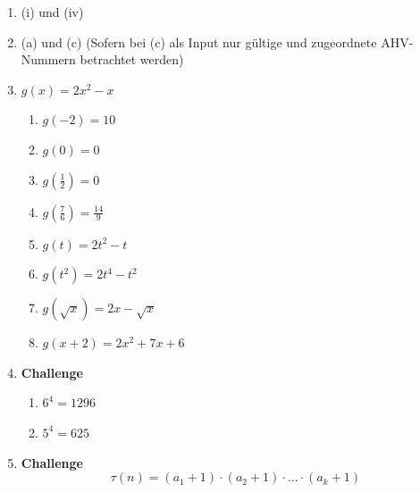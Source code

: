 \begin{enumerate}
    \item (i) und (iv)
    \item (a) und (c) (Sofern bei (c) als Input nur gültige und zugeordnete AHV-Nummern betrachtet werden)
    \item \(g(x) = 2x^2-x\)
          \begin{enumerate}
              \item \(g(-2)=10\)
              \item \(g(0)=0\)
              \item \(g\left(\frac12\right)=0\)
              \item \(g\left(\frac76\right)=\frac{14}{9}\)
              \item \(g(t)=2t^2-t\)
              \item \(g(t^2)=2t^4-t^2\)
              \item \(g(\sqrt{x})=2x-\sqrt{x}\)
              \item \(g(x+2)=2x^2+7x+6\)
          \end{enumerate}


    \item \textbf{Challenge}
          \begin{enumerate}
              \item \(6^4=1296\)
              \item \(5^4=625\)
          \end{enumerate}

    \item \textbf{Challenge}
          \[
              \tau(n)=(a_1+1)\cdot(a_2+1)\cdot
              \ldots\cdot(a_k+1)
          \]
\end{enumerate}